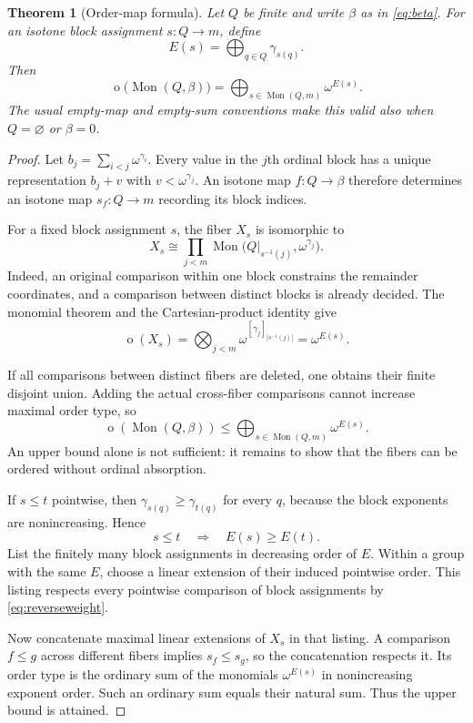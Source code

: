 \documentclass[11pt,a4paper]{article}
\newtheorem{theorem}{Theorem}[section]
\theoremstyle{definition}
\theoremstyle{remark}
\newcommand{\Mon}{\operatorname{Mon}}
\newcommand{\otype}{\operatorname{o}}
\newcommand{\Nrep}[2]{\left[#1\right]_{#2}}
\begin{document}
\begin{theorem}[Order-map formula]\label{thm:block}
Let $Q$ be finite and write $\beta$ as in \eqref{eq:beta}. For an isotone
block assignment $s:Q\to m$, define
\[
 E(s)=\bigoplus_{q\in Q}\gamma_{s(q)}.
\]
Then
\begin{equation}\label{eq:main}
 \boxed{\otype\bigl(\Mon(Q,\beta)\bigr)
       =\bigoplus_{s\in\Mon(Q,m)}\omega^{E(s)}.}
\end{equation}
The usual empty-map and empty-sum conventions make this valid also when
$Q=\varnothing$ or $\beta=0$.
\end{theorem}
\begin{proof}
Let $b_j=\sum_{i<j}\omega^{\gamma_i}$. Every value in the $j$th ordinal
block has a unique representation $b_j+v$ with $v<\omega^{\gamma_j}$.
An isotone map $f:Q\to\beta$ therefore determines an isotone map $s_f:Q\to m$
recording its block indices.

For a fixed block assignment $s$, the fiber $X_s$ is isomorphic to
\begin{equation}\label{eq:blockfiber}
 X_s\cong
 \prod_{j<m}\Mon\bigl(Q|_{s^{-1}(j)},\omega^{\gamma_j}\bigr).
\end{equation}
Indeed, an original comparison within one block constrains the remainder
coordinates, and a comparison between distinct blocks is already decided.
The monomial theorem and the Cartesian-product identity give
\[
 \otype(X_s)
 =\bigotimes_{j<m}\omega^{\Nrep{\gamma_j}{|s^{-1}(j)|}}
 =\omega^{E(s)}.
\]

If all comparisons between distinct fibers are deleted, one obtains their
finite disjoint union. Adding the actual cross-fiber comparisons cannot
increase maximal order type, so
\[
 \otype(\Mon(Q,\beta))
 \leq\bigoplus_{s\in\Mon(Q,m)}\omega^{E(s)}.
\]
An upper bound alone is not sufficient: it remains to show that the fibers
can be ordered without ordinal absorption.

If $s\leq t$ pointwise, then $\gamma_{s(q)}\geq\gamma_{t(q)}$ for every
$q$, because the block exponents are nonincreasing. Hence
\begin{equation}\label{eq:reverseweight}
 s\leq t\quad\Longrightarrow\quad E(s)\geq E(t).
\end{equation}
List the finitely many block assignments in decreasing order of $E$.
Within a group with the same $E$, choose a linear extension of their
induced pointwise order. This listing respects every pointwise comparison
of block assignments by \eqref{eq:reverseweight}.

Now concatenate maximal linear extensions of $X_s$ in that listing.
A comparison $f\leq g$ across different fibers implies $s_f\leq s_g$,
so the concatenation respects it. Its order type is the ordinary sum of
the monomials $\omega^{E(s)}$ in nonincreasing exponent order. Such an
ordinary sum equals their natural sum. Thus the upper bound is attained.
\end{proof}
\end{document}
